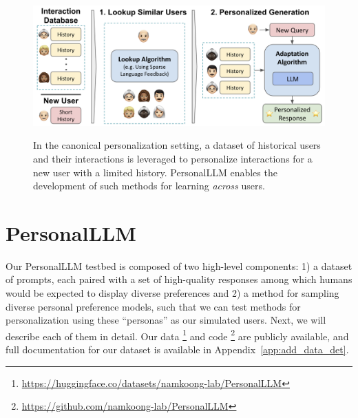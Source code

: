 \begin{figure}[t]
    \centering
\textbf{}    \includegraphics[width = \textwidth]{figures/metalearn_fig.png}
    \caption{In the canonical personalization setting, a dataset of historical users and their interactions is leveraged to personalize interactions for a new user with a limited history. \textsf{PersonalLLM} enables the development of such methods for learning \textit{across} users.}
    \label{fig:metalearn}
\end{figure}

\section{PersonalLLM}\label{sec:dataset}

Our \textsf{PersonalLLM} testbed is composed of two high-level components:
1) a dataset of prompts, each paired with a set of high-quality responses among which humans would be expected to display diverse preferences and
2) a method for sampling diverse personal preference models, such that we can test methods for personalization using these ``personas'' as our simulated users.
Next, we will describe each of them in detail.  Our data \footnote{\url{https://huggingface.co/datasets/namkoong-lab/PersonalLLM}} and code \footnote{\url{https://github.com/namkoong-lab/PersonalLLM}} are publicly available,  and full documentation for our dataset is available in Appendix~\ref{app:add_data_det}.

